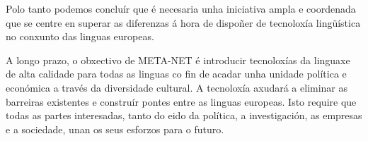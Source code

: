 \begin{multicols}{2}
Polo tanto podemos concluír que é necesaria unha iniciativa ampla e coordenada que se centre en superar as diferenzas á hora de dispoñer de tecnoloxía lingüística no conxunto das linguas europeas.

A longo prazo, o obxectivo de META-NET é introducir tecnoloxías da linguaxe de alta calidade para todas as linguas co fin de acadar unha unidade política e económica a través da diversidade cultural. A tecnoloxía axudará a eliminar as barreiras existentes e construír pontes entre as linguas europeas. Isto require que todas as partes interesadas, tanto do eido da política, a investigación, as empresas e a sociedade, unan os seus esforzos para o futuro.

\end{multicols}

\clearpage

